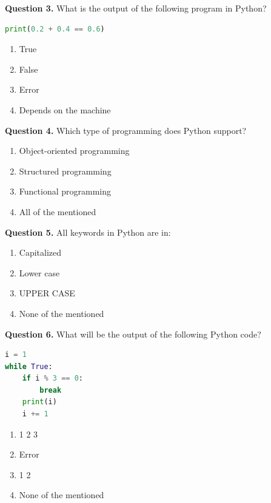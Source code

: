 \documentclass[11pt,a4paper]{article}
\begin{document}
\medskip


\noindent   \textbf{Question 3.} What is the output of the following program in Python?

\begin{lstlisting}[language=Python]
print(0.2 + 0.4 == 0.6)
\end{lstlisting}

\begin{enumerate}[label=(\alph*),itemsep=2pt]
  \item True
  \item False
  \item Error
  \item Depends on the machine
\end{enumerate}

\medskip


\noindent   \textbf{Question 4.} Which type of programming does Python support?

\begin{enumerate}[label=(\alph*),itemsep=2pt]
  \item Object-oriented programming
  \item Structured programming
  \item Functional programming
  \item All of the mentioned
\end{enumerate}

\medskip


\noindent   \textbf{Question 5.} All keywords in Python are in:

\begin{enumerate}[label=(\alph*),itemsep=2pt]
  \item Capitalized
  \item Lower case
  \item UPPER CASE
  \item None of the mentioned
\end{enumerate}

\medskip


\noindent   \textbf{Question 6.} What will be the output of the following Python code?

\begin{lstlisting}[language=Python]
i = 1
while True:
    if i % 3 == 0:
        break
    print(i)
    i += 1
\end{lstlisting}

\begin{enumerate}[label=(\alph*),itemsep=2pt]
  \item 1 2 3
  \item Error
  \item 1 2
  \item None of the mentioned
\end{enumerate}
\end{document}
